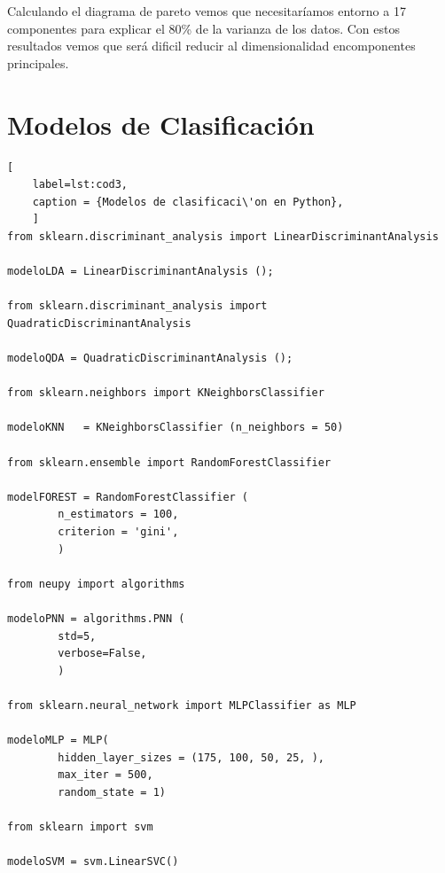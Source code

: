 \documentclass{article}
\begin{document}
Calculando el diagrama de pareto vemos que necesitaríamos entorno a 17
componentes para explicar el 80\% de la varianza de los datos. Con
estos resultados vemos que  será dificil reducir al dimensionalidad
encomponentes principales.

\newpage
\section{Modelos de Clasificación}

\begin{lstlisting}[
	label=lst:cod3,
	caption = {Modelos de clasificaci\'on en Python},
	]
from sklearn.discriminant_analysis import LinearDiscriminantAnalysis

modeloLDA = LinearDiscriminantAnalysis ();

from sklearn.discriminant_analysis import QuadraticDiscriminantAnalysis

modeloQDA = QuadraticDiscriminantAnalysis ();

from sklearn.neighbors import KNeighborsClassifier

modeloKNN   = KNeighborsClassifier (n_neighbors = 50)

from sklearn.ensemble import RandomForestClassifier

modelFOREST = RandomForestClassifier (
        n_estimators = 100,
        criterion = 'gini',
        )

from neupy import algorithms

modeloPNN = algorithms.PNN (
        std=5,
        verbose=False,
        )

from sklearn.neural_network import MLPClassifier as MLP

modeloMLP = MLP(
        hidden_layer_sizes = (175, 100, 50, 25, ),
        max_iter = 500,
        random_state = 1)

from sklearn import svm

modeloSVM = svm.LinearSVC()
\end{lstlisting}
\end{document}
